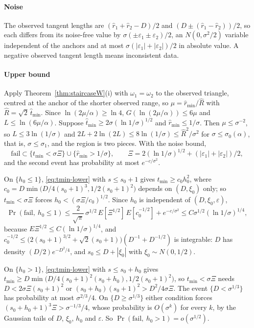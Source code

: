 \paragraph{Noise} The observed tangent lengths are $(\hat r_1 + \hat r_2 - D)/2$ and $(D \pm (\hat r_1 - \hat r_2))/2$, so
each differs from its noise-free value by $\sigma(\pm\varepsilon_1 \pm \varepsilon_2)/2$, an $N(0, \sigma^2/2)$ variable
independent of the anchors and at most $\sigma(|\varepsilon_1| + |\varepsilon_2|)/2$ in absolute value. A negative
observed tangent length means inconsistent data.

\paragraph{Upper bound} Apply Theorem~\ref{thm:staircaseW}(i) with $\omega_1 = \omega_2$ to the observed triangle, centred at the
anchor of the shorter observed range, so $\mu = \hat r_{\min}/\hat R$ with $\hat R = \sqrt2\,\hat t_{\min}$. Since
$\ln(2\mu/\alpha) \ge \ln 4$, $G(\ln(2\mu/\alpha)) \le 6\mu$ and $L \le \ln(6\mu/\alpha)$. Suppose
$\hat t_{\min} \ge 2\sigma(\ln 1/\sigma)^{1/2}$ and $\hat r_{\min} \le 1/\sigma$. Then $\mu \le \sigma^{-2}$, so
$L \le 3\ln(1/\sigma)$ and $2L + 2\ln(2L) \le 8\ln(1/\sigma) \le \hat R^2/\sigma^2$ for $\sigma \le \sigma_0(\alpha)$, that is,
$\sigma \le \sigma_1$, and the region is two pieces. With the noise bound,
\[ \text{fail} \subset \{t_{\min} < \sigma\Xi\} \cup \{\hat r_{\min} > 1/\sigma\}, \qquad
   \Xi = 2(\ln 1/\sigma)^{1/2} + (|\varepsilon_1| + |\varepsilon_2|)/2, \]
and the second event has probability at most $e^{-c/\sigma^2}$.

On $\{h_0 \le 1\}$, \eqref{eq:tmin-lower} with $s \le s_0 + 1$ gives $t_{\min} \ge c_0h_0^2$, where
$c_0 = D\min\bigl(D/4(s_0 + 1)^3, 1/2(s_0 + 1)^2\bigr)$ depends on $(D, \xi_0)$ only; so $t_{\min} < \sigma\Xi$ forces
$h_0 < (\sigma\Xi/c_0)^{1/2}$. Since $h_0$ is independent of $(D, \xi_0, \varepsilon)$,
\[ \Pr(\text{fail},\ h_0 \le 1) \le \frac{2}{\sqrt\pi}\,\sigma^{1/2}\,E[\Xi^{1/2}]\,E[c_0^{-1/2}] + e^{-c/\sigma^2}
   \le C\sigma^{1/2}(\ln 1/\sigma)^{1/4}, \]
because $E\Xi^{1/2} \le C(\ln 1/\sigma)^{1/4}$, and $c_0^{-1/2} \le \bigl(2(s_0 + 1)^{3/2} + \sqrt2(s_0 + 1)\bigr)(D^{-1} + D^{-1/2})$
is integrable: $D$ has density $(D/2)e^{-D^2/4}$, and $s_0 \le D + |\xi_0|$ with $\xi_0 \sim N(0, 1/2)$.

On $\{h_0 > 1\}$, \eqref{eq:tmin-lower} with $s \le s_0 + h_0$ gives
$t_{\min} \ge D\min\bigl(D/4(s_0 + 1)^2(s_0 + h_0), 1/2(s_0 + 1)^2\bigr)$, so $t_{\min} < \sigma\Xi$ needs
$D < 2\sigma\Xi(s_0 + 1)^2$ or $(s_0 + h_0)(s_0 + 1)^2 > D^2/4\sigma\Xi$. The event $\{D < \sigma^{1/3}\}$
has probability at most $\sigma^{2/3}/4$. On $\{D \ge \sigma^{1/3}\}$ either condition forces
$(s_0 + h_0 + 1)^3\Xi > \sigma^{-1/3}/4$, whose probability is $O(\sigma^k)$ for every $k$, by the Gaussian tails of
$D$, $\xi_0$, $h_0$ and $\varepsilon$. So $\Pr(\text{fail},\ h_0 > 1) = o(\sigma^{1/2})$.

